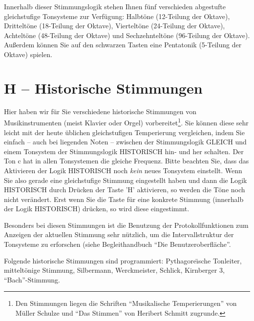 Innerhalb dieser Stimmungslogik stehen Ihnen fünf verschieden abgestufte 
gleichstufige Tonsysteme zur Ver\-fü\-gung:
Halbtöne (12-Teilung der Oktave), Dritteltöne (18-Teilung 
der Oktave), Vierteltöne (24-Teilung der Oktave), Achteltöne 
(48-Teilung der Oktave) und Sechzehnteltöne (96-Teilung der Oktave).
Außerdem können Sie auf den schwarzen Tasten eine Pentatonik (5-Teilung der 
Oktave) spielen. 

\section{H -- Historische Stimmungen}\label{sec:h-hist-stimm}
Hier haben wir für Sie verschiedene historische Stimmungen von 
Musikinstrumenten (meist Klavier oder Orgel) 
vorbereitet\footnote{Den Stimmungen liegen die Schriften 
"`Musikalische Temperierungen"' von Müller Schulze und 
"`Das Stimmen"' von Heribert Schmitt zugrunde.}. Sie 
können diese sehr leicht mit der heute üblichen 
gleichstufigen Temperierung vergleichen, indem Sie einfach -- 
auch bei liegenden Noten -- zwischen der 
Stimmungslogik GLEICH und einem Tonsystem der Stimmungslogik HISTORISCH 
hin- und her schalten. Der Ton c hat in allen Tonsystemen die gleiche 
Frequenz. Bitte beachten Sie, dass das Aktivieren der Logik 
HISTORISCH noch \emph{kein} neues Tonsystem einstellt. Wenn Sie also 
gerade eine gleichstufige Stimmung eingestellt haben und dann die 
Logik HISTORISCH durch Drücken der Taste 'H' aktivieren, so werden die 
Töne noch nicht verändert. Erst wenn Sie die Taste für eine 
konkrete Stimmung (innerhalb der Logik HISTORISCH) drücken, so 
wird diese eingestimmt.

Besonders bei diesen Stimmungen ist die Benutzung der
Protokollfunktionen zum Anzeigen der aktuellen Stimmung sehr nützlich,
um die Intervallstruktur der Tonsysteme zu erforschen (siehe
Begleithandbuch "`Die Benutzeroberfläche"'.

Folgende historische Stimmungen sind programmiert: Pythagore\"{\i}sche
Tonleiter, mitteltönige Stimmung, Silbermann, Werckmeister, Schlick,
Kirnberger 3, "`Bach"'-Stimmung.  
 
 
 
  
  


